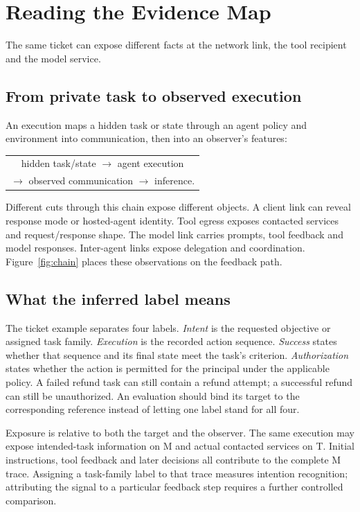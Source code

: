 \section{Reading the Evidence Map}\label{sec:taxonomy}
The same ticket can expose different facts at the network link, the tool recipient and the model service.
\subsection{From private task to observed execution}
An execution maps a hidden task or state through an agent policy and environment into communication, then into an observer's features:
\begin{center}
\begin{tabular}{c}
hidden task/state $\longrightarrow$ agent execution\\
$\longrightarrow$ observed communication $\longrightarrow$ inference.
\end{tabular}
\end{center}
Different cuts through this chain expose different objects. A client link can reveal response mode or hosted-agent identity. Tool egress exposes contacted services and request/response shape. The model link carries prompts, tool feedback and model responses. Inter-agent links expose delegation and coordination. Figure~\ref{fig:chain} places these observations on the feedback path.




\subsection{What the inferred label means}
The ticket example separates four labels. \emph{Intent} is the requested objective or assigned task family. \emph{Execution} is the recorded action sequence. \emph{Success} states whether that sequence and its final state meet the task's criterion. \emph{Authorization} states whether the action is permitted for the principal under the applicable policy. A failed refund task can still contain a refund attempt; a successful refund can still be unauthorized. An evaluation should bind its target to the corresponding reference instead of letting one label stand for all four.

Exposure is relative to both the target and the observer. The same execution may expose intended-task information on M and actual contacted services on T. Initial instructions, tool feedback and later decisions all contribute to the complete M trace. Assigning a task-family label to that trace measures intention recognition; attributing the signal to a particular feedback step requires a further controlled comparison.


